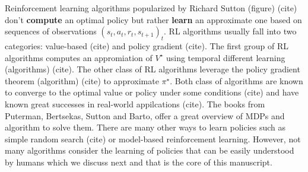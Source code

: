 Reinforcement learning algorithms popularized by Richard Sutton (figure) (cite) don't \textbf{compute} an optimal policy but rather \textbf{learn} an approximate one based on sequences of observations ${(s_t, a_t, r_t, s_{t+1})}_t$.
RL algorithms usually fall into two categories: value-based (cite) and policy gradient (cite). The first group of RL algorithms computes an appromiation of $V^{\star}$ using temporal different learning (algorithms) (cite). The other class of RL algorithms leverage the policy gradient theorem (algorithm) (cite) to approximate $\pi^{\star}$.
Both class of algorithms are known to converge to the optimal value or policy under some conditions (cite) and have known great successes in real-world appilcations (cite).
The books from Puterman, Bertsekas, Sutton and Barto, offer a great overview of MDPs and algorithm to solve them.
There are many other ways to learn policies such as simple random search (cite) or model-based reinforcement learning. However, not many algorithms consider the learning of policies that can be easily understood by humans which we discuss next and that is the core of this manuscript.

